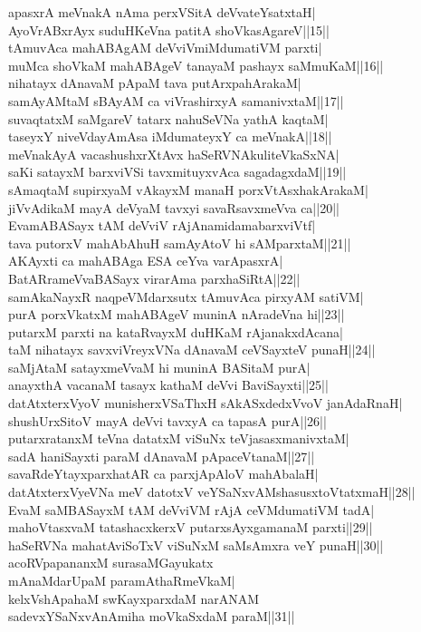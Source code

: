 \documentclass{article}
\begin{document}
apasxrA meVnakA nAma perxVSitA deVvateYsatxtaH|\\
AyoVrABxrAyx suduHKeVna patitA shoVkasAgareV||15||\\
tAmuvAca mahABAgAM deVviVmiMdumatiVM parxti|\\
muMca shoVkaM mahABAgeV tanayaM pashayx saMmuKaM||16||\\
nihatayx dAnavaM pApaM tava putArxpahArakaM|\\
samAyAMtaM sBAyAM ca viVrashirxyA samanivxtaM||17||\\
suvaqtatxM saMgareV tatarx nahuSeVNa yathA kaqtaM|\\
taseyxY niveVdayAmAsa iMdumateyxY ca meVnakA||18||\\
meVnakAyA vacashushxrXtAvx haSeRVNAkuliteVkaSxNA|\\
saKi satayxM barxviVSi tavxmituyxvAca sagadagxdaM||19||\\
sAmaqtaM supirxyaM vAkayxM manaH porxVtAsxhakArakaM|\\
jiVvAdikaM mayA deVyaM tavxyi savaRsavxmeVva ca||20||\\
EvamABASayx tAM deVviV rAjAnamidamabarxviVtf|\\
tava putorxV mahAbAhuH samAyAtoV hi sAMparxtaM||21||\\
AKAyxti ca mahABAga ESA ceYva varApasxrA|\\
BatARrameVvaBASayx virarAma parxhaSiRtA||22||\\
samAkaNayxR naqpeVMdarxsutx tAmuvAca pirxyAM satiVM|\\
purA porxVkatxM mahABAgeV muninA nAradeVna hi||23||\\
putarxM parxti na kataRvayxM duHKaM rAjanakxdAcana|\\
taM nihatayx savxviVreyxVNa dAnavaM ceVSayxteV punaH||24||\\
saMjAtaM satayxmeVvaM hi muninA BASitaM purA|\\
anayxthA vacanaM tasayx kathaM deVvi BaviSayxti||25||\\
datAtxterxVyoV munisherxVSaThxH sAkASxdedxVvoV janAdaRnaH|\\
shushUrxSitoV mayA deVvi tavxyA ca tapasA purA||26||\\
putarxratanxM teVna datatxM viSuNx teVjasasxmanivxtaM|\\
sadA haniSayxti paraM dAnavaM pApaceVtanaM||27||\\
savaRdeYtayxparxhatAR ca parxjApAloV mahAbalaH|\\
datAtxterxVyeVNa meV datotxV veYSaNxvAMshasusxtoVtatxmaH||28||\\
EvaM saMBASayxM tAM deVviVM rAjA ceVMdumatiVM tadA|\\
mahoVtasxvaM tatashacxkerxV putarxsAyxgamanaM parxti||29||\\
haSeRVNa mahatAviSoTxV viSuNxM saMsAmxra veY punaH||30||\\
acoRVpapananxM surasaMGayukatx\\
mAnaMdarUpaM paramAthaRmeVkaM|\\
kelxVshApahaM swKayxparxdaM narANAM\\
sadevxYSaNxvAnAmiha moVkaSxdaM paraM||31||
\end{document}
